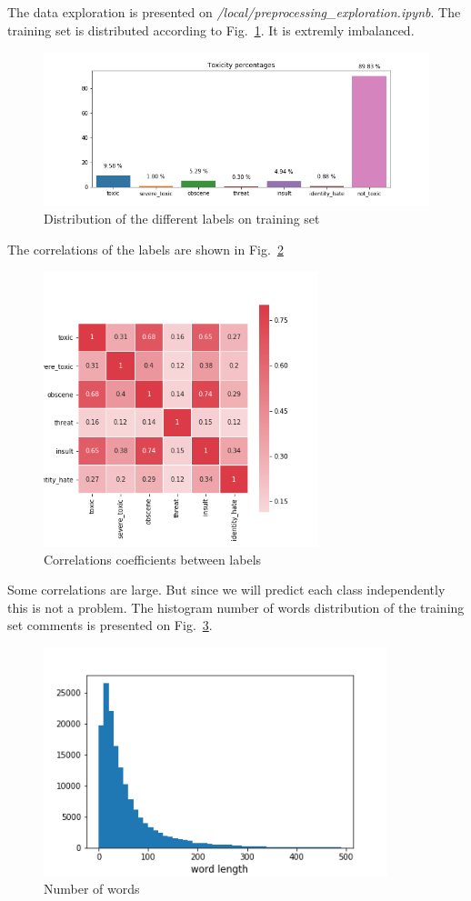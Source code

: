 \documentclass{report}
\begin{document}
The data exploration is presented on \emph{/local/preprocessing\_exploration.ipynb}. 
The training set is distributed according to Fig.~\ref{fig:bar_plot}. It is extremly imbalanced. 
\begin{figure}[!h]
  \includegraphics[width=\textwidth]{../local/plots_tables/bar_plot.png}
  \caption{Distribution of the different labels on training set}
  \label{fig:bar_plot}
\end{figure}
The correlations of the labels are shown in Fig.~\ref{fig:corr}
\begin{figure}[!h]
\centering
  \includegraphics[width=80mm]{../local/plots_tables/corr.png}
  \caption{Correlations coefficients between labels}
  \label{fig:corr}
\end{figure}
Some correlations are large. But since we will predict each class independently this is not a problem. The histogram number of words distribution of the training set comments is presented on Fig.~\ref{fig:hist}. 
\begin{figure}[!h]
\centering
  \includegraphics[width=100mm]{../local/plots_tables/word_length_hist.png}
  \caption{Number of words}
  \label{fig:hist}
\end{figure}
\end{document}
